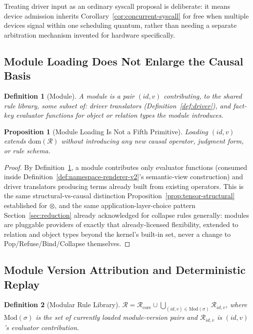 \documentclass[11pt]{article}
\newtheorem{definition}{Definition}[section]
\newtheorem{proposition}{Proposition}[section]
\begin{document}
Treating driver input as an ordinary syscall proposal is deliberate: it means device admission inherits Corollary~\ref{cor:concurrent-syscall} for free when multiple devices signal within one scheduling quantum, rather than needing a separate arbitration mechanism invented for hardware specifically.

\subsection{Module Loading Does Not Enlarge the Causal Basis}

\begin{definition}[Module]
\label{def:module}
A module is a pair $(id, v)$ contributing, to the shared rule library, some subset of: driver translators (Definition~\ref{def:driver}), and fact-key evaluator functions for object or relation types the module introduces.
\end{definition}

\begin{proposition}[Module Loading Is Not a Fifth Primitive]
\label{prop:module-not-primitive}
Loading $(id,v)$ extends $\mathrm{dom}(\mathcal{R})$ without introducing any new causal operator, judgment form, or rule schema.
\end{proposition}
\begin{proof}
By Definition~\ref{def:module}, a module contributes only evaluator functions (consumed inside Definition~\ref{def:namespace-renderer-v2}'s semantic-view construction) and driver translators producing terms already built from existing operators. This is the same structural-vs-causal distinction Proposition~\ref{prop:tensor-structural} established for $\otimes$, and the same application-layer-choice pattern Section~\ref{sec:reduction} already acknowledged for collapse rules generally: modules are pluggable providers of exactly that already-licensed flexibility, extended to relation and object types beyond the kernel's built-in set, never a change to Pop/Refuse/Bind/Collapse themselves.
\end{proof}

\subsection{Module Version Attribution and Deterministic Replay}

\begin{definition}[Modular Rule Library]
\label{def:modular-library}
$\mathcal{R} = \mathcal{R}_{\mathrm{core}} \cup \bigcup_{(id,v) \in \mathrm{Mod}(\sigma)} \mathcal{R}_{id,v}$, where $\mathrm{Mod}(\sigma)$ is the set of currently loaded module-version pairs and $\mathcal{R}_{id,v}$ is $(id,v)$'s evaluator contribution.
\end{definition}
\end{document}
